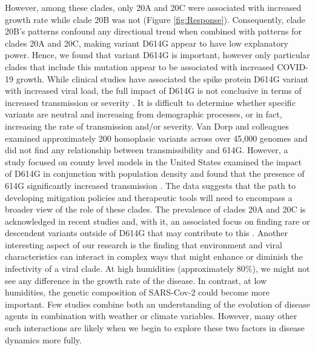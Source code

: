 \documentclass[9pt,twocolumn,twoside,lineno]{pnas-new}
\begin{document}
However, among these clades, only 20A and 20C were associated with increased growth rate while clade 20B was not (Figure \ref{fig:Response}). Consequently, clade 20B’s patterns confound any directional trend when combined with patterns for clades 20A and 20C, making variant D614G appear to have low explanatory power. Hence, we found that variant D614G is important, however only particular clades that include this mutation appear to be associated with increased COVID-19 growth. While clinical studies have associated the spike protein D614G variant with increased viral load, the full impact of D614G is not conclusive in terms of increased transmission or severity \cite{Grubaugh2020-ps, Raghav2020-uz}. It is difficult to determine whether specific variants are neutral and increasing from demographic processes, or in fact, increasing the rate of transmission and/or severity. Van Dorp and colleagues \cite{Van_Dorp2020-gt} examined approximately 200 homoplasic variants across over 45,000 genomes and did not find any relationship between transmissibility and 614G. However, a study focused on county level models in the United States examined the impact of D614G in conjunction with population density and found that the presence of 614G significantly increased transmission \cite{Ives2020-ue}. The data suggests that the path to developing mitigation policies and therapeutic tools will need to encompass a broader view of the role of these clades. The prevalence of clades 20A and 20C is acknowledged in recent studies and, with it, an associated focus on finding rare or descendent variants outside of D614G that may contribute to this \cite{Hartley2020-vf, Paul_undated-lp}. 
Another interesting aspect of our research is the finding that environment and viral characteristics can interact in complex ways that might enhance or diminish the infectivity of a viral clade. At high humidities (approximately 80\%), we might not see any difference in the growth rate of the disease. In contrast, at low humidities, the genetic composition of SARS-Cov-2 could become more important. Few studies combine both an understanding of the evolution of disease agents in combination with weather or climate variables. However, many other such interactions are likely when we begin to explore these two factors in disease dynamics more fully.
\end{document}
